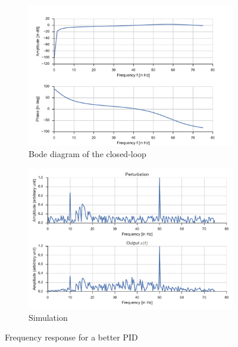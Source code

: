 \begin{figure}
    \centering
    \begin{subfigure}{0.49\textwidth}
        \includegraphics[width=\textwidth]{img/ctl_freqresp_bestpid}
        \caption{\label{fig:ctl_freqresp_bestpid} Bode diagram of the closed-loop}
    \end{subfigure}
    \hfill
    \begin{subfigure}{0.49\textwidth}
        \includegraphics[width=\textwidth]{img/ctl_sim_bestpid}
        \caption{\label{fig:ctl_sim_bestpid}Simulation}
    \end{subfigure}    
    \caption{Frequency response for a better PID}
\end{figure}

